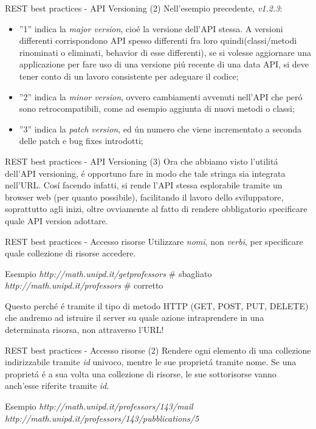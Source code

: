 \documentclass{beamer}
\begin{document}
\begin{frame}{REST best practices - API Versioning (2)}
Nell'esempio precedente,  \emph{v1.2.3}:
\begin{itemize}
\item ''1'' indica la \emph{major version}, cio\'e la versione dell'API stessa. A versioni differenti corrispondono API spesso differenti fra loro quindi(classi/metodi rinominati o eliminati, behavior di esse differenti), se si volesse aggiornare una applicazione per fare uso di una versione pi\'u recente di una data API, si deve tener conto di un lavoro consistente per adeguare il codice;
\item ''2'' indica la \emph{minor version}, ovvero cambiamenti avvenuti nell'API che per\'o sono retrocompatibili, come ad
 esempio aggiunta di nuovi metodi o classi;
\item ''3'' indica la \emph{patch version}, ed \' un numero che viene incrementato a seconda delle patch e bug fixes introdotti;
\end{itemize}
\end{frame}


\begin{frame}{REST best practices - API Versioning (3)}
Ora che abbiamo visto l'utilit\'a dell'API versioning, \'e opportuno fare in modo che tale stringa sia integrata nell'URL.
Cos\'i facendo infatti, si rende l'API stessa esplorabile tramite un browser web (per quanto possibile), facilitando il lavoro dello
sviluppatore, soprattutto agli inizi, oltre ovviamente al fatto di rendere obbligatorio specificare quale API version adottare.
\end{frame}


\begin{frame}{REST best practices - Accesso risorse}
Utilizzare \emph{nomi}, non \emph{verbi}, per specificare quale collezione di risorse accedere.
\begin{exampleblock}{Esempio}
\emph{http://math.unipd.it/getprofessors} \# sbagliato
\newline
\emph{http://math.unipd.it/professors} \# corretto
\end{exampleblock}
Questo perch\'e \'e tramite il tipo di metodo HTTP (GET, POST, PUT, DELETE) che andremo ad istruire il server su quale azione
intraprendere in una determinata risorsa, non attraverso l'URL!
\end{frame}


\begin{frame}{REST best practices - Accesso risorse (2)}
Rendere ogni elemento di una collezione indirizzabile tramite \emph{id} univoco, mentre le sue propriet\'a tramite nome. Se
una propriet\'a \'e a sua volta una collezione di risorse, le sue sottorisorse vanno anch'esse riferite tramite \emph{id}.
\begin{exampleblock}{Esempio}
\emph{http://math.unipd.it/professors/143/mail}
\newline
\emph{http://math.unipd.it/professors/143/pubblications/5} 
\end{exampleblock}
\end{frame}
\end{document}
